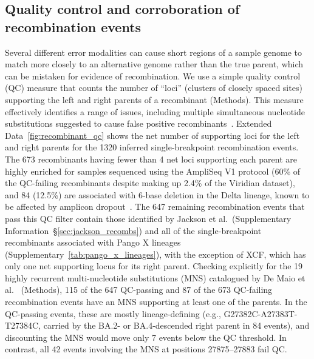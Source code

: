 \documentclass[12pt]{article}
\newcommand{\supref}[1]{Supplementary Information~\S\ref{#1}}
\newcommand{\edref}[1]{Extended Data~\ref{#1}}
\newcommand{\siref}[1]{Supplementary~\ref{#1}}
\begin{document}
\subsection*{Quality control and corroboration of recombination events}
Several different error modalities can cause short regions
of a sample genome to match more closely
to an alternative genome rather than the true parent,
which can be mistaken for evidence of recombination.
We use a simple quality control (QC) measure
that counts the number of ``loci'' (clusters of closely spaced sites)
supporting the left and right parents of a recombinant (Methods).
This measure effectively identifies a range of issues,
including multiple simultaneous nucleotide substitutions
suggested to cause false positive recombinants~\cite{DeMaio2024}.
\edref{fig:recombinant_qc} shows
the net number of supporting loci for the left and right parents
for the 1320 inferred single-breakpoint recombination events.
The 673 recombinants having fewer than 4 net loci supporting each parent
are highly enriched for samples sequenced using the AmpliSeq V1 protocol
(60\% of the QC-failing recombinants
despite making up 2.4\% of the Viridian dataset), and
84 (12.5\%) are associated with 6-base deletion in the Delta lineage,
known to be affected by amplicon dropout~\cite{Sanderson2021}.
The 647 remaining recombination events that pass this QC filter
contain those identified by Jackson et al.\ (\supref{sec:jackson_recombs})
and all of the single-breakpoint recombinants associated with Pango X lineages
(\siref{tab:pango_x_lineages}), with the exception of XCF,
which has only one net supporting locus for its right parent.
Checking explicitly for the 19 highly recurrent
multi-nucleotide substitutions (MNS)
catalogued by De Maio et al.~\cite{DeMaio2024} (Methods),
115 of the 647 QC-passing and 87 of the 673 QC-failing recombination events
have an MNS supporting at least one of the parents.
In the QC-passing events, these are mostly lineage-defining
(e.g., G27382C-A27383T-T27384C,
carried by the BA.2- or BA.4-descended right parent in 84 events),
and discounting the MNS would move only 7 events below the QC threshold.
In contrast, all 42 events involving the MNS at positions 27875--27883 fail QC.
\end{document}
